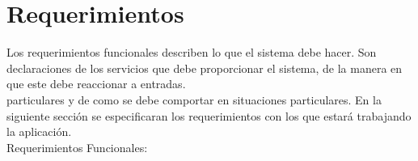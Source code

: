 \begin{itemize}
\end{itemize}


\section{Requerimientos}
Los requerimientos funcionales describen lo que el sistema debe hacer. Son declaraciones de los
servicios que debe proporcionar el sistema, de la manera en que este debe reaccionar a entradas.\\
particulares y de como se debe comportar en situaciones particulares.
En la siguiente sección se especificaran los requerimientos con los que estará trabajando la aplicación.\\

Requerimientos Funcionales:

